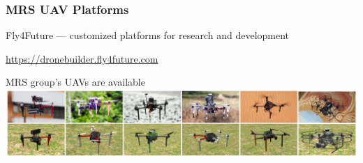 \documentclass[aspectratio=169]{beamer}
\begin{document}
\begin{frame}
\frametitle{MRS UAV Platforms}

\begin{block}{Fly4Future --- customized platforms for research and development}
  \begin{center}
    \Large\url{https://dronebuilder.fly4future.com}
  \end{center}
\end{block}

\begin{block}{MRS group's UAVs are available}
  \includegraphics[width=1.0\textwidth]{./fig/uavs.png}
\end{block}

\end{frame}


\end{document}

